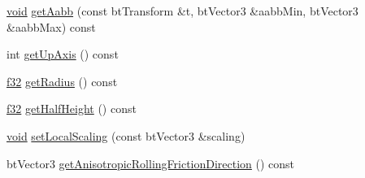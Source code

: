 \begin{DoxyCompactItemize}
\item 
\mbox{\hyperlink{_thread_8h_af1e856da2e658414cb2456cb6f7ebc66}{void}} \mbox{\hyperlink{classnjli_1_1_physics_shape_capsule_a0fbdf8a10688efc4a289b4fca48b33af}{get\+Aabb}} (const bt\+Transform \&t, bt\+Vector3 \&aabb\+Min, bt\+Vector3 \&aabb\+Max) const
\item 
int \mbox{\hyperlink{classnjli_1_1_physics_shape_capsule_a4cfa7c77b533b55bf5fc4d6bd9554afc}{get\+Up\+Axis}} () const
\item 
\mbox{\hyperlink{_util_8h_a5f6906312a689f27d70e9d086649d3fd}{f32}} \mbox{\hyperlink{classnjli_1_1_physics_shape_capsule_a14ecb677772d4798d4bdcb5c3f971db2}{get\+Radius}} () const
\item 
\mbox{\hyperlink{_util_8h_a5f6906312a689f27d70e9d086649d3fd}{f32}} \mbox{\hyperlink{classnjli_1_1_physics_shape_capsule_aa70e8084e84fb039010c16416eb126e6}{get\+Half\+Height}} () const
\item 
\mbox{\hyperlink{_thread_8h_af1e856da2e658414cb2456cb6f7ebc66}{void}} \mbox{\hyperlink{classnjli_1_1_physics_shape_capsule_aced243d46142c8680d87e2cf4fbfc5f7}{set\+Local\+Scaling}} (const bt\+Vector3 \&scaling)
\item 
bt\+Vector3 \mbox{\hyperlink{classnjli_1_1_physics_shape_capsule_a8bb4ac31afc01e2d17d0891eb29d072a}{get\+Anisotropic\+Rolling\+Friction\+Direction}} () const
\end{DoxyCompactItemize}

